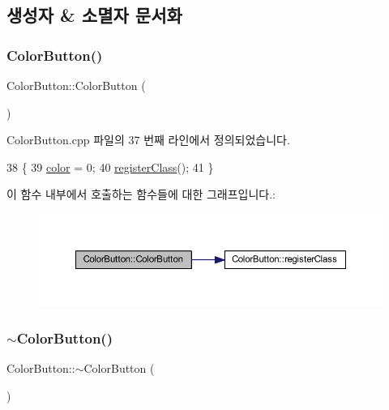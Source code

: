 \subsection{생성자 \& 소멸자 문서화}
\mbox{\label{class_color_button_a4b8e318941c5c69efd5a610fd7edb51e}} 
\subsubsection{\texorpdfstring{Color\+Button()}{ColorButton()}}
{\footnotesize\ttfamily Color\+Button\+::\+Color\+Button (\begin{DoxyParamCaption}{ }\end{DoxyParamCaption})}



Color\+Button.\+cpp 파일의 37 번째 라인에서 정의되었습니다.


\begin{DoxyCode}
38 \{
39   \mbox{\hyperlink{class_color_button_ac2e59577aba7413fbf40c97f21df4835}{color}} = 0;
40   \mbox{\hyperlink{class_color_button_aabbc7306d4354479e0315b2a15026571}{registerClass}}();
41 \}
\end{DoxyCode}
이 함수 내부에서 호출하는 함수들에 대한 그래프입니다.\+:
\nopagebreak
\begin{figure}[H]
\begin{center}
\leavevmode
\includegraphics[width=350pt]{class_color_button_a4b8e318941c5c69efd5a610fd7edb51e_cgraph}
\end{center}
\end{figure}
\mbox{\label{class_color_button_a992ff40e28cd869985afcf02ef338797}} 
\subsubsection{\texorpdfstring{$\sim$\+Color\+Button()}{~ColorButton()}}
{\footnotesize\ttfamily Color\+Button\+::$\sim$\+Color\+Button (\begin{DoxyParamCaption}{ }\end{DoxyParamCaption})\hspace{0.3cm}{\ttfamily [virtual]}}



